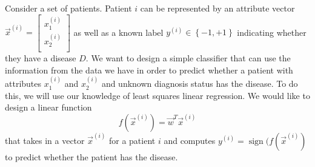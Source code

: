 
Consider a set of patients. Patient $i$ can be represented by an attribute vector $\vec{x}^{(i)} = \begin{bmatrix}
x_1^{(i)}\\ 
x_2^{(i)}\\ 
\end{bmatrix}$ as well as a known label $y^{(i)} \in \left \{ -1, +1 \right \}$ indicating whether they have a disease $D$. We want to design a simple classifier that can use the information from the data we have in order to predict whether a patient with attributes $x_1^{(i)}$ and $x_2^{(i)}$ and unknown diagnosis status has the disease. To do this, we will use our knowledge of least squares linear regression. We would like to design a linear function
$$f\left(\vec{x}^{(i)}\right) = \vec{w}^T \vec{x}^{(i)}$$
that takes in a vector $\vec{x}^{(i)}$ for a patient $i$ and computes $y^{(i)} = \operatorname{sign}(f(\vec{x}^{(i)})$ to predict whether the patient has the disease.

